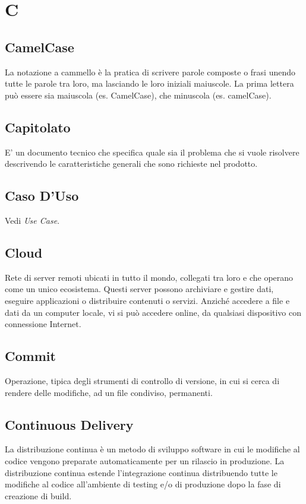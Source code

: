 \section*{C}

\subsection{CamelCase}
La notazione a cammello è la pratica di scrivere parole composte o frasi unendo tutte le parole tra loro, ma lasciando le loro iniziali maiuscole. La prima lettera può essere sia maiuscola (es. CamelCase), che minuscola (es. camelCase).

\subsection{Capitolato}
E' un documento tecnico che specifica quale sia il problema che si vuole risolvere descrivendo le caratteristiche generali che sono richieste nel prodotto.

\subsection{Caso D'Uso}
Vedi \textit{Use Case}.

\subsection{Cloud}
Rete di server remoti ubicati in tutto il mondo, collegati tra loro e che operano come un unico ecosistema. Questi server possono archiviare e gestire dati, eseguire applicazioni o distribuire contenuti o servizi. Anziché accedere a file e dati da un computer locale, vi si può accedere online, da qualsiasi dispositivo con connessione Internet.

\subsection{Commit}
Operazione, tipica degli strumenti di controllo di versione, in cui si cerca di rendere delle modifiche, ad un file condiviso, permanenti.

\subsection{Continuous Delivery}
La distribuzione continua è un metodo di sviluppo software in cui le modifiche al codice vengono preparate automaticamente per un rilascio in produzione. La distribuzione continua estende l'integrazione continua distribuendo tutte le modifiche al codice all'ambiente di testing e/o di produzione dopo la fase di creazione di build. 

